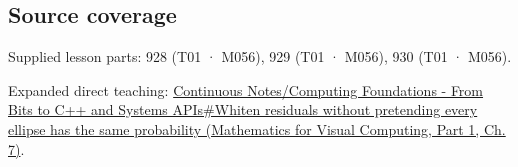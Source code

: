 \subsection{Source coverage}\label{appendix-12bbe185dbe5-source-coverage}

\hypertarget{appendix-12bbe185dbe5-source-coverage}{}

Supplied lesson parts: 928 (T01 · M056), 929 (T01 · M056), 930 (T01 · M056).

Expanded direct teaching: \href{../02-Mathematics-for-Visual-Computing-P01/main.pdf\#nameddest=02-foundations-ii-ch023-whiten-residuals-without-pretending-every-ellipse-has-the-same-probability}{Continuous Notes/Computing Foundations - From Bits to C++ and Systems APIs\#Whiten residuals without pretending every ellipse has the same probability (Mathematics for Visual Computing, Part 1, Ch. 7)}.
